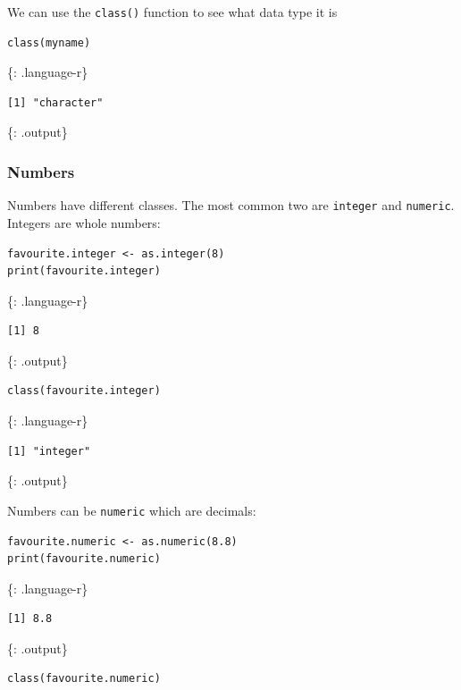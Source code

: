 \documentclass[]{article}
\begin{document}
We can use the \texttt{class()} function to see what data type it is

\begin{verbatim}
class(myname)
\end{verbatim}

\{: .language-r\}

\begin{verbatim}
[1] "character"
\end{verbatim}

\{: .output\}

\subsubsection{Numbers}\label{numbers}

Numbers have different classes. The most common two are \texttt{integer}
and \texttt{numeric}. Integers are whole numbers:

\begin{verbatim}
favourite.integer <- as.integer(8)
print(favourite.integer)
\end{verbatim}

\{: .language-r\}

\begin{verbatim}
[1] 8
\end{verbatim}

\{: .output\}

\begin{verbatim}
class(favourite.integer)
\end{verbatim}

\{: .language-r\}

\begin{verbatim}
[1] "integer"
\end{verbatim}

\{: .output\}

Numbers can be \texttt{numeric} which are decimals:

\begin{verbatim}
favourite.numeric <- as.numeric(8.8)
print(favourite.numeric)
\end{verbatim}

\{: .language-r\}

\begin{verbatim}
[1] 8.8
\end{verbatim}

\{: .output\}

\begin{verbatim}
class(favourite.numeric)
\end{verbatim}
\end{document}
